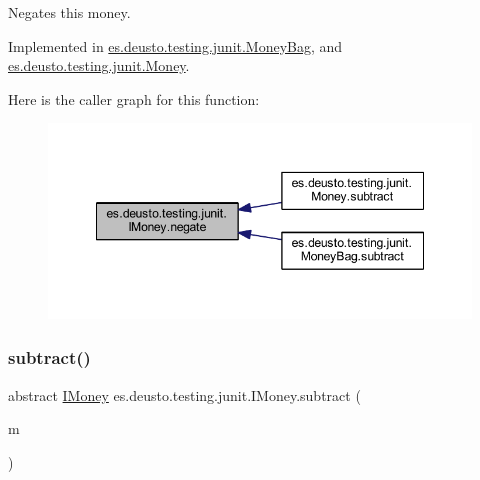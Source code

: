 Negates this money. 

Implemented in \mbox{\hyperlink{classes_1_1deusto_1_1testing_1_1junit_1_1_money_bag_abf06bf97e548f95038756608fe0c8351}{es.\+deusto.\+testing.\+junit.\+Money\+Bag}}, and \mbox{\hyperlink{classes_1_1deusto_1_1testing_1_1junit_1_1_money_ae5f0bc3ea87f1fd55d6478653b8f2e36}{es.\+deusto.\+testing.\+junit.\+Money}}.

Here is the caller graph for this function\+:
\nopagebreak
\begin{figure}[H]
\begin{center}
\leavevmode
\includegraphics[width=348pt]{interfacees_1_1deusto_1_1testing_1_1junit_1_1_i_money_a741967d7aa89055b6873619303b11385_icgraph}
\end{center}
\end{figure}
\mbox{\label{interfacees_1_1deusto_1_1testing_1_1junit_1_1_i_money_a1fb4981aa759e3fe0679654bec7a8b61}} 
\subsubsection{\texorpdfstring{subtract()}{subtract()}}
{\footnotesize\ttfamily abstract \mbox{\hyperlink{interfacees_1_1deusto_1_1testing_1_1junit_1_1_i_money}{I\+Money}} es.\+deusto.\+testing.\+junit.\+I\+Money.\+subtract (\begin{DoxyParamCaption}\item[{\mbox{\hyperlink{interfacees_1_1deusto_1_1testing_1_1junit_1_1_i_money}{I\+Money}}}]{m }\end{DoxyParamCaption})\hspace{0.3cm}{\ttfamily [abstract]}}

